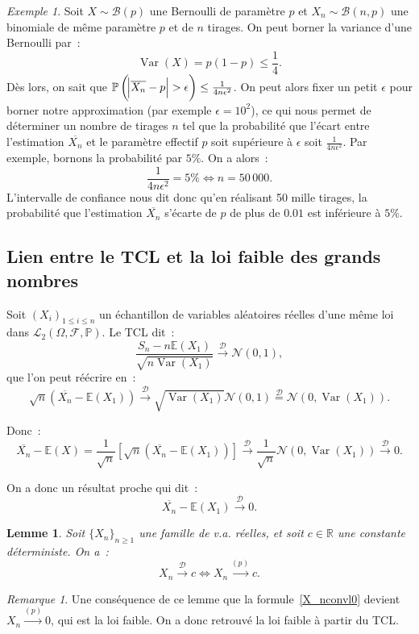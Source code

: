 \documentclass{article}
\newcommand{\E}{\mathbb E}
\renewcommand{\P}{\mathbb P}
\newcommand{\R}{\mathbb R}
\newcommand{\Nzu}{\mathcal N(0, 1)}  %
\newcommand{\convl}{\stackrel{\mathcal D}\to}  %
\newcommand{\espproba}[3]{\left(#1, #2, #3\right)}  %
\newcommand{\Ofp}{\espproba \Omega{\mathcal F}\P}  %
\newcommand{\Ld}{\mathcal L_2\Ofp}  %
\newcommand{\Ces}{\overline}  %
\newcommand{\convp}{\stackrel {(p)}\to}  %
\DeclareMathOperator{\Var}{Var}
\newtheorem{lem}[thm]{Lemme}
\theoremstyle{definition}
\theoremstyle{remark}
\newtheorem*{rmq}{Remarque}
\newtheorem{ex}{Exemple}
\begin{document}
		\begin{ex} Soit $X \sim \mathcal B(p)$ une Bernoulli de paramètre $p$ et $X_n \sim \mathcal B(n, p)$ une binomiale de même paramètre $p$ et de $n$ tirages.
		On peut borner la variance d'une Bernoulli par~:
		\[\Var(X) = p(1-p) \leq \frac 14.\]
		Dès lors, on sait que $\P\left(\abs {\Ces {X_n} - p} > \epsilon\right) \leq \frac 1{4n\epsilon^2}$. On peut alors fixer un petit $\epsilon$
		pour borner notre approximation (par exemple $\epsilon = 10^2$), ce qui nous permet de déterminer un nombre de tirages $n$ tel que la probabilité
		que l'écart entre l'estimation $\Ces {X_n}$ et le paramètre effectif $p$ soit supérieure à $\epsilon$ soit $\frac 1{4n\epsilon^2}$. Par exemple, bornons
		la probabilité par $5\%$. On a alors~:
		\[\frac 1{4n\epsilon^2} = 5\% \iff n = 50\,000.\]
		L'intervalle de confiance nous dit donc qu'en réalisant 50 mille tirages, la probabilité que l'estimation $\Ces {X_n}$ s'écarte de $p$ de plus de $0.01$
		est inférieure à $5\%$.
		\end{ex}

	\subsection{Lien entre le TCL et la loi faible des grands nombres}
		Soit $(X_i)_{1 \leq i \leq n}$ un échantillon de variables aléatoires réelles d'une même loi dans $\Ld$. Le TCL dit~:
		\[\frac {S_n - n\E(X_1)}{\sqrt {n\Var(X_1)}} \convl \Nzu,\]
		que l'on peut réécrire en~:
		\[\sqrt n\left(\Ces {X_n} - \E(X_1)\right) \convl \sqrt {\Var(X_1)}\Nzu \stackrel {\mathcal D}= \mathcal N(0, \Var(X_1)).\]

		Donc~:
		\[\Ces {X_n} - \E(X) = \frac 1{\sqrt n}\left[\sqrt n\left(\Ces {X_n} - \E(X_1)\right)\right] \convl \frac 1{\sqrt n}\mathcal N(0, \Var(X_1)) \convl 0.\]

		On a donc un résultat proche qui dit~:
		\begin{equation}\label{X_nconvl0}
			\Ces {X_n} - \E(X_1) \convl 0.
		\end{equation}

		\begin{lem} Soit $\{X_n\}_{n \geq 1}$ une famille de v.a. réelles, et soit $c \in \R$ une constante déterministe. On a~:
		\[X_n \convl c \iff X_n \convp c.\]
		\end{lem}

		\begin{rmq} Une conséquence de ce lemme que la formule~\eqref{X_nconvl0} devient $X_n \convp 0$, qui est la loi faible. On a donc retrouvé la loi
		faible à partir du TCL. \end{rmq}
\end{document}

